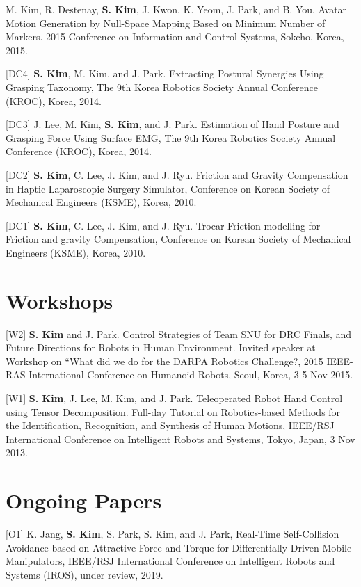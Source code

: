 \documentclass[margin,line]{res}
\begin{document}
\begin{resume}
[DC5] M. Kim, R. Destenay, \textbf{S. Kim}, J. Kwon, K. Yeom, {J. Park}, and B. You.
Avatar Motion Generation by Null-Space Mapping Based on Minimum Number of Markers.
2015 Conference on Information and Control Systems,
Sokcho, Korea, 2015.

[DC4] \textbf{S. Kim}, M. Kim, and J. Park.
Extracting Postural Synergies Using Grasping Taxonomy, 
The 9th Korea Robotics Society Annual Conference (KROC), Korea, 2014.

[DC3] J. Lee, M. Kim, \textbf{S. Kim}, and J. Park.
Estimation of Hand Posture and Grasping Force Using Surface EMG, 
The 9th Korea Robotics Society Annual Conference (KROC), Korea, 2014.

[DC2] \textbf{S. Kim}, C. Lee, J. Kim, and J. Ryu.
Friction and Gravity Compensation in Haptic Laparoscopic Surgery Simulator,
Conference on Korean Society of Mechanical Engineers (KSME), Korea, 2010.


[DC1] \textbf{S. Kim}, C. Lee, J. Kim, and J. Ryu.
Trocar Friction modelling for Friction and gravity Compensation,
Conference on Korean Society of Mechanical Engineers (KSME), Korea, 2010.

\section{\sc Workshops}
[W2] \textbf{S. Kim} and {J. Park}.
Control Strategies of Team SNU for DRC Finals, and Future Directions for Robots in Human Environment.
Invited speaker at Workshop on “What did we do for the DARPA Robotics Challenge?, 
2015 IEEE-RAS International Conference on Humanoid Robots,
Seoul, Korea, 3-5 Nov 2015.

[W1] \textbf{S. Kim}, J. Lee, M. Kim, and {J. Park}.
Teleoperated Robot Hand Control using Tensor Decomposition.
Full-day Tutorial on Robotics-based Methods for the Identification, Recognition, and Synthesis of Human Motions,
IEEE/RSJ International Conference on Intelligent Robots and Systems, 
Tokyo, Japan, 3 Nov 2013.

\section{\sc Ongoing Papers}

[O1] K. Jang, \textbf{S. Kim},  S. Park, S. Kim, and J. Park, Real-Time Self-Collision Avoidance based on Attractive Force and Torque for Differentially Driven Mobile Manipulators, 
IEEE/RSJ International Conference on Intelligent Robots and Systems (IROS), under review, 2019.


\end{resume}
\end{document}
